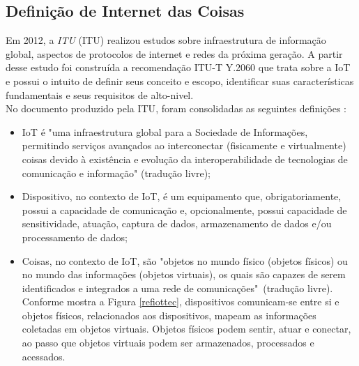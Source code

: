 \subsection{Definição de Internet das Coisas}
	\quad Em 2012, a \textit{\acrlong{ITU}} (\acrshort{ITU}) realizou estudos sobre infraestrutura
	de informação global, aspectos de protocolos de internet e redes da próxima geração.
	A partir desse estudo foi construída a recomendação ITU-T Y.2060 \cite{ITU} que trata sobre a \acrlong{IoT}
	e possui o intuito de definir seus conceito e escopo, identificar
	suas características fundamentais e seus requisitos de alto-nivel.
  \\ \null
  \quad	No documento produzido pela \acrshort{ITU}, foram consolidadas as seguintes definições \cite{ITU}:
	\begin{itemize}
		\item \acrlong{IoT} é "uma infraestrutura global para a Sociedade de Informações, permitindo serviços avançados ao
		interconectar (fisicamente e virtualmente) coisas devido à existência e evolução da interoperabilidade
	de tecnologias de comunicação e informação" (tradução livre);%
		\item Dispositivo, no contexto de \acrshort{IoT}, é um equipamento que, obrigatoriamente, possui a capacidade
		de comunicação e, opcionalmente, possui capacidade de sensitividade, atuação, captura de dados,
		armazenamento de dados e/ou processamento de dados;
		\item Coisas, no contexto de \acrshort{IoT}, são "objetos
	no mundo físico (objetos físicos) ou no mundo das informações (objetos virtuais), os quais são capazes
	de serem identificados e integrados a uma rede de comunicações"\ (tradução livre). Conforme mostra a Figura \ref{refiottec}, dispositivos comunicam-se entre si e objetos físicos, relacionados aos dispositivos, mapeam as informações coletadas em objetos virtuais. Objetos físicos podem sentir, atuar e conectar, ao passo que objetos virtuais podem ser armazenados, processados e acessados.
	\end{itemize}
